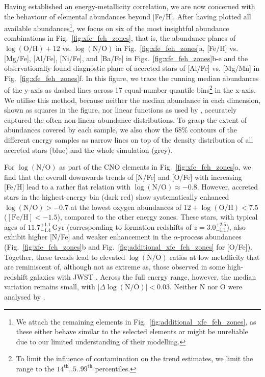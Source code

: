 \documentclass[fleqn,usenatbib]{mnras}
\newcommand{\changed}[1]{{{#1}}}
\begin{document}
Having established an energy-metallicity correlation, we are now concerned with the behaviour of elemental abundances beyond [Fe/H]. After having plotted all available abundances\footnote{We attach the remaining elements in Fig.~\ref{fig:additional_xfe_feh_zones}, as these either behave similar to the selected elements or might be unreliable due to our limited understanding of their modelling.}, we focus on six of the most insightful abundance combinations in Fig.~\ref{fig:xfe_feh_zones}, that is, the abundance planes of $\log(\mathrm{O/H}) + 12$ vs. $\log(\mathrm{N/O})$ in Fig.~\ref{fig:xfe_feh_zones}a, [Fe/H] vs. [Mg/Fe], [Al/Fe], [Ni/Fe], and [Ba/Fe] in Figs.~\ref{fig:xfe_feh_zones}b-e and the observationally found diagnostic plane of accreted stars of [Al/Fe] vs. [Mg/Mn] \citep{Hawkins2015, Das2020} in Fig.~\ref{fig:xfe_feh_zones}f. In this figure, we trace the running median abundances of the y-axis as dashed lines across 17 equal-number quantile bins\footnote{To limit the influence of contamination on the trend estimates, we limit the range to the $14^\mathrm{th}..5..99^\mathrm{th}$ percentiles.} in the x-axis. We utilise this method, because neither the median abundance in each dimension, shown as squares in the figure, nor linear functions as used by \citet{Skuladottir2025}, accurately captured the often non-linear abundance distributions. To grasp the exten\changed{t} of abundances covered by each sample, we also show the 68\% contours of the different energy samples as narrow lines on top of the density distribution of all accreted stars (blue) and the whole simulation (grey).

For $\log(\mathrm{N/O})$ as part of the CNO elements in Fig.~\ref{fig:xfe_feh_zones}a, we find that the overall downwards trends of [N/Fe] and [O/Fe] with increasing [Fe/H] lead to a rather flat relation with $\log(\mathrm{N/O}) \approx -0.8$. \changed{However, accreted stars in the highest-energy bin (dark red) show systematically enhanced $\log(\mathrm{N/O}) > -0.7$ at the lowest oxygen abundances of $12 + \log(\mathrm{O/H}) < 7.5$ ($\mathrm{[Fe/H]} < -1.5$), compared to the other energy zones.} These stars, with typical ages of $11.7_{-1.4}^{+1.1}\,\mathrm{Gyr}$ (corresponding to formation redshifts of $z = 3.0_{-1.1}^{+2.5}$), also exhibit higher [N/Fe] and weaker enhancement in the $\alpha$-process abundances (Fig.~\ref{fig:xfe_feh_zones}b and Fig.~\ref{fig:additional_xfe_feh_zones} for [O/Fe]). \changed{Together, these trends lead to elevated $\log(\mathrm{N/O})$ ratios at low metallicity that are reminiscent of, although not as extreme as, those observed in some high-redshift galaxies with JWST \citep{Cameron2023, Senchyna2024, Ji2026}.} \changed{Across the full energy range, however, the median variation remains small, with $\vert\Delta\log(\mathrm{N/O})\vert < 0.03$.} Neither N nor O were analysed by \citet{Skuladottir2025}.
\end{document}

